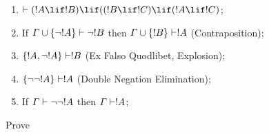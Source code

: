 \documentclass[../../../include/open-logic-section]{subfiles}
\begin{document}
\begin{prop}
\begin{enumerate}
\item $\Proves (!A \lif !B) \lif ((!B \lif !C)
  \lif (!A \lif !C)$; 
\item If $\Gamma \cup \{ \lnot !A\}
  \Proves \lnot !B$ then $\Gamma \cup \{ !B\} \Proves
  !A$ (Contraposition); 
\item  $\{ !A, \lnot!A\} \Proves
    !B$ (Ex Falso Quodlibet, Explosion); 
\item  $\{ \lnot\lnot!A\} \Proves
  !A$ (Double Negation Elimination);
\item If $\Gamma \Proves \lnot\lnot!A$ then $\Gamma \Proves
  !A$;
\end{enumerate}
\end{prop}

\begin{prob}
  Prove 
\end{prob}
\end{document}
